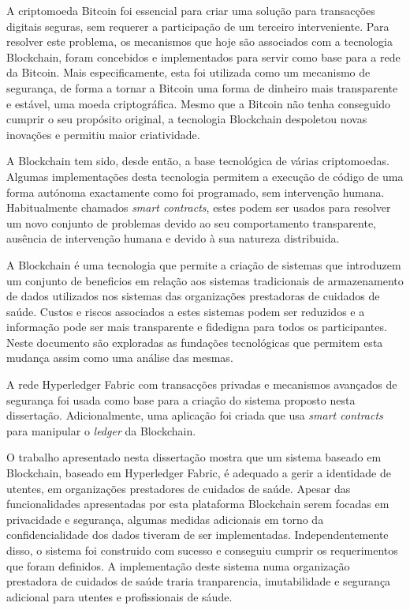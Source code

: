 \begin{tueSUMARIO}

  A criptomoeda Bitcoin foi essencial para criar uma solução para transacções
  digitais seguras, sem requerer a participação de um terceiro interveniente.
  Para resolver este problema, os mecanismos que hoje são associados com a
  tecnologia Blockchain, foram concebidos e implementados para servir como base
  para a rede da Bitcoin. Mais especificamente, esta foi utilizada como um
  mecanismo de segurança, de forma a tornar a Bitcoin uma forma de dinheiro
  mais transparente e estável, uma moeda criptográfica. Mesmo que a Bitcoin não
  tenha conseguido cumprir o seu propósito original, a tecnologia Blockchain
  despoletou novas inovações e permitiu maior criatividade.

  A Blockchain tem sido, desde então, a base tecnológica de várias
  criptomoedas. Algumas implementações desta tecnologia permitem a execução de
  código de uma forma autónoma exactamente como foi programado, sem intervenção
  humana.  Habitualmente chamados \textit{smart contracts}, estes podem ser
  usados para resolver um novo conjunto de problemas devido ao seu
  comportamento transparente, ausência de intervenção humana e devido à sua
  natureza distribuida. 

  A Blockchain é uma tecnologia que permite a criação de sistemas que
  introduzem um conjunto de beneficios em relação aos sistemas tradicionais de
  armazenamento de dados utilizados nos sistemas das organizações prestadoras
  de cuidados de saúde. Custos e riscos associados a estes sistemas podem ser
  reduzidos e a informação pode ser mais transparente e fidedigna para todos os
  participantes. Neste documento são exploradas as fundações tecnológicas que
  permitem esta mudança assim como uma análise das mesmas.

  A rede Hyperledger Fabric com transacções privadas e mecanismos avançados de
  segurança foi usada como base para a criação do sistema proposto nesta
  dissertação. Adicionalmente, uma aplicação foi criada que usa \textit{smart
  contracts} para manipular o \textit{ledger} da Blockchain.

  O trabalho apresentado nesta dissertação mostra que um sistema baseado em
  Blockchain, baseado em Hyperledger Fabric, é adequado a gerir a identidade de
  utentes,  em organizações prestadores de cuidados de saúde. Apesar das
  funcionalidades apresentadas por esta plataforma Blockchain serem focadas em
  privacidade e segurança, algumas medidas adicionais em torno da
  confidencialidade dos dados tiveram de ser implementadas. Independentemente
  disso, o sistema foi construido com sucesso e conseguiu cumprir os
  requerimentos que foram definidos. A implementação deste sistema numa
  organização prestadora de cuidados de saúde traria tranparencia,
  imutabilidade e segurança adicional para utentes e profissionais de sáude.

\end{tueSUMARIO}
